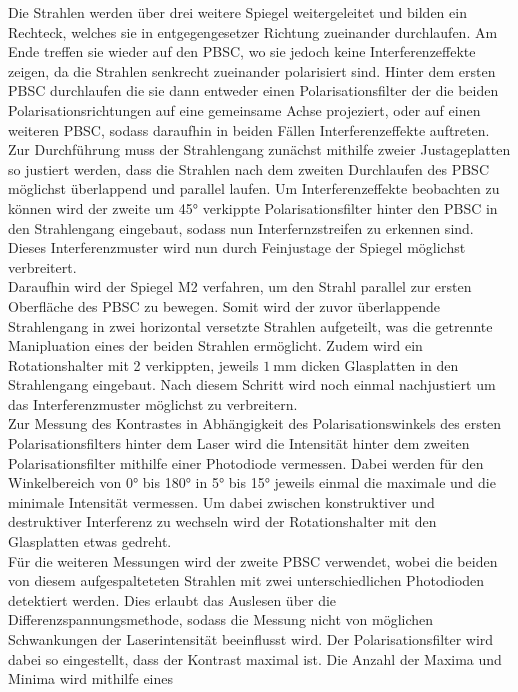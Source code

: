 Die Strahlen werden über drei weitere Spiegel weitergeleitet und bilden ein Rechteck, welches
sie in entgegengesetzer Richtung zueinander durchlaufen. Am Ende treffen sie wieder auf den
PBSC, wo sie jedoch keine Interferenzeffekte zeigen, da die Strahlen senkrecht zueinander polarisiert sind.
Hinter dem ersten PBSC durchlaufen die sie dann entweder einen Polarisationsfilter der die beiden
Polarisationsrichtungen auf eine gemeinsame Achse projeziert, oder auf einen weiteren PBSC,
sodass daraufhin in beiden Fällen Interferenzeffekte auftreten.\\
Zur Durchführung muss der Strahlengang zunächst mithilfe zweier Justageplatten so justiert werden,
dass die Strahlen nach dem zweiten Durchlaufen des PBSC möglichst überlappend und parallel laufen.
Um Interferenzeffekte beobachten zu können wird der zweite um 45° verkippte
Polarisationsfilter hinter den PBSC in den
Strahlengang eingebaut, sodass nun Interfernzstreifen zu erkennen sind. Dieses Interferenzmuster
wird nun durch Feinjustage der Spiegel möglichst verbreitert.\\
Daraufhin wird der Spiegel M2 verfahren, um den Strahl parallel zur ersten Oberfläche des PBSC zu bewegen.
Somit wird
der zuvor überlappende Strahlengang in zwei horizontal versetzte Strahlen aufgeteilt, was die getrennte
Manipluation eines der beiden Strahlen ermöglicht. Zudem
wird ein Rotationshalter mit 2 verkippten, jeweils $\SI{1}{\milli\metre}$ dicken Glasplatten
in den Strahlengang eingebaut.
Nach diesem Schritt wird noch einmal nachjustiert um
das Interferenzmuster möglichst zu verbreitern.\\
Zur Messung des Kontrastes in Abhängigkeit des Polarisationswinkels des ersten
Polarisationsfilters hinter dem Laser wird die Intensität hinter dem zweiten
Polarisationsfilter mithilfe einer Photodiode vermessen. Dabei werden für den Winkelbereich von
0° bis 180° in 5° bis 15° jeweils einmal die maximale und die minimale Intensität vermessen. Um dabei
zwischen konstruktiver und destruktiver Interferenz zu wechseln wird der Rotationshalter mit den Glasplatten
etwas gedreht. \\
Für die weiteren Messungen wird der zweite PBSC verwendet, wobei die beiden von diesem aufgespalteteten Strahlen mit zwei unterschiedlichen
Photodioden detektiert werden. Dies erlaubt das Auslesen über die Differenzspannungsmethode,
sodass die Messung nicht von möglichen Schwankungen der Laserintensität beeinflusst wird.
Der Polarisationsfilter wird dabei so eingestellt,
dass der Kontrast maximal ist. Die Anzahl der Maxima und Minima wird mithilfe eines
